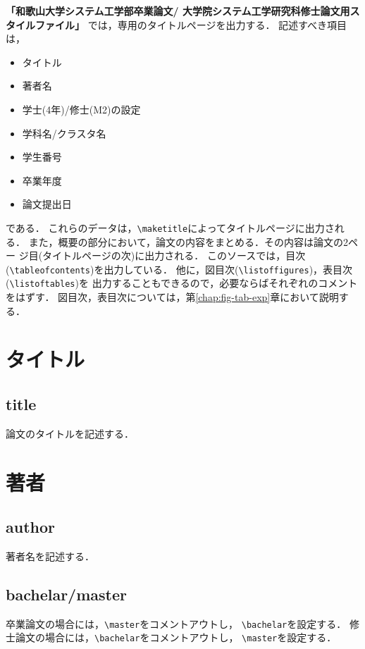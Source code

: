 \documentclass[11pt,dvipdfmx]{jreport}
\begin{document}
{\bf 「和歌山大学システム工学部卒業論文/
大学院システム工学研究科修士論文用スタイルファイル」}\cite{wusethesis}
では，専用のタイトルページを出力する．
記述すべき項目は，
\begin{itemize}
  \item タイトル
  \item 著者名
  \item 学士(4年)/修士(M2)の設定
  \item 学科名/クラスタ名
  \item 学生番号
  \item 卒業年度
  \item 論文提出日
\end{itemize}
である．
これらのデータは，\verb|\maketitle|によってタイトルページに出力される．
また，概要の部分において，論文の内容をまとめる．その内容は論文の2ペー
ジ目(タイトルページの次)に出力される．
このソースでは，目次(\verb|\tableofcontents|)を出力している．
他に，図目次(\verb|\listoffigures|)，表目次(\verb|\listoftables|)を
出力することもできるので，必要ならばそれぞれのコメントをはずす．
図目次，表目次については，第\ref{chap:fig-tab-exp}章において説明する．

\section{タイトル}
\subsection{title}
論文のタイトルを記述する．

\section{著者}
\subsection{author}
著者名を記述する．

\subsection{bachelar/master}
卒業論文の場合には，\verb|\master|をコメントアウトし，
\verb|\bachelar|を設定する．
修士論文の場合には，\verb|\bachelar|をコメントアウトし，
\verb|\master|を設定する．
\end{document}

